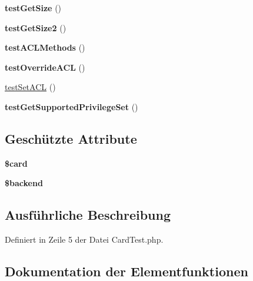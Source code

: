 \begin{DoxyCompactItemize}
{\bfseries test\+Get\+Size} ()
\item 
\mbox{\label{class_sabre_1_1_card_d_a_v_1_1_card_test_aaea57003cea85b3c3ab85f8b103a6b50}} 
{\bfseries test\+Get\+Size2} ()
\item 
\mbox{\label{class_sabre_1_1_card_d_a_v_1_1_card_test_ac5035e0eea201b5cb9ec836fe3e42ac4}} 
{\bfseries test\+A\+C\+L\+Methods} ()
\item 
\mbox{\label{class_sabre_1_1_card_d_a_v_1_1_card_test_a2e7efa51baec16300205f61a924edce8}} 
{\bfseries test\+Override\+A\+CL} ()
\item 
\mbox{\hyperlink{class_sabre_1_1_card_d_a_v_1_1_card_test_a66754817c039eb5feb28156b7156900d}{test\+Set\+A\+CL}} ()
\item 
\mbox{\label{class_sabre_1_1_card_d_a_v_1_1_card_test_afa9b29cf85794252888edd59c3c70129}} 
{\bfseries test\+Get\+Supported\+Privilege\+Set} ()
\end{DoxyCompactItemize}
\subsection*{Geschützte Attribute}
\begin{DoxyCompactItemize}
\item 
\mbox{\label{class_sabre_1_1_card_d_a_v_1_1_card_test_ae2f06ab50d5d433e90d8bbff3dc8c044}} 
{\bfseries \$card}
\item 
\mbox{\label{class_sabre_1_1_card_d_a_v_1_1_card_test_affc86797b64271c3c5f2dfe484540f08}} 
{\bfseries \$backend}
\end{DoxyCompactItemize}


\subsection{Ausführliche Beschreibung}


Definiert in Zeile 5 der Datei Card\+Test.\+php.



\subsection{Dokumentation der Elementfunktionen}
\mbox{\label{class_sabre_1_1_card_d_a_v_1_1_card_test_afff5b38b80910c27abb1a9edc8cd81aa}} 
